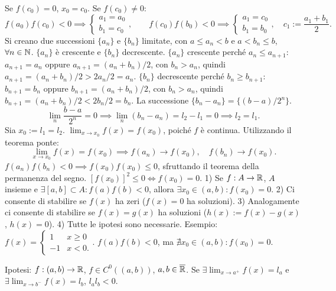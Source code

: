 Se $f(c_0)=0$, $x_0=c_0$. Se $f(c_0)\ne0$:
\[f(a_0)f(c_0)<0\implies\begin{cases}a_1=a_0\\b_1=c_0\end{cases},\qquad f(c_0)f(b_0)<0\implies\begin{cases}a_1=c_0\\b_1=b_0\end{cases},\quad c_1:=\frac{a_1+b_1}{2}.\]
Si creano due successioni $\{a_n\}$ e $\{b_n\}$ limitate, con $a\le a_n<b$ e $a<b_n\le b$, $\forall n\in\mathbb N$.
$\{a_n\}$ è crescente e $\{b_n\}$ decrescente.
$\{a_n\}$ crescente perché $a_n\le a_{n+1}$: $a_{n+1}=a_n$ oppure $a_{n+1}=(a_n+b_n)/2$, con $b_n>a_n$, quindi $a_{n+1}=(a_n+b_n)/2>2a_n/2=a_n$.
$\{b_n\}$ decrescente perché $b_n\ge b_{n+1}$: $b_{n+1}=b_n$ oppure $b_{n+1}=(a_n+b_n)/2$, con $b_n>a_n$, quindi $b_{n+1}=(a_n+b_n)/2<2b_n/2=b_n$.
La successione $\{b_n-a_n\}=\{(b-a)/2^n\}$.
\[\lim_n\frac{b-a}{2^n}=0\implies\lim_n(b_n-a_n)=l_2-l_1=0\implies l_2=l_1.\]
Sia $x_0:=l_1=l_2$. $\lim_{x\to x_0}f(x)=f(x_0)$, poiché $f$ è continua.
Utilizzando il teorema ponte:
\[\lim_{x\to x_0}f(x)=f(x_0)\implies f(a_n)\to f(x_0),\quad f(b_n)\to f(x_0).\]
$f(a_n)f(b_n)<0\implies f(x_0)f(x_0)\le0$, sfruttando il teorema della permanenza del segno.
$[f(x_0)]^2\le0\iff f(x_0)=0$.
1) Se $f:A\to\mathbb R$, $A$ insieme e $\exists[a,b]\subset A:f(a)f(b)<0$, allora $\exists x_0\in(a,b):f(x_0)=0$.
2) Ci consente di stabilire se $f(x)$ ha zeri ($f(x)=0$ ha soluzioni).
3) Analogamente ci consente di stabilire se $f(x)=g(x)$ ha soluzioni ($h(x):=f(x)-g(x)$, $h(x)=0$).
4) Tutte le ipotesi sono necessarie.
Esempio: $f(x)=\begin{cases}1&x\ge0\\-1&x<0.\end{cases}$.
$f(a)f(b)<0$, ma $\nexists x_0\in(a,b):f(x_0)=0$.
\begin{center}\end{center}
Ipotesi: $f:(a,b)\to\mathbb R$, $f\in C^0((a,b))$, $a,b\in\overline{\mathbb R}$.
Se $\exists\lim_{x\to a^+}f(x)=l_a$ e $\exists\lim_{x\to b^-}f(x)=l_b$, $l_al_b<0$.
